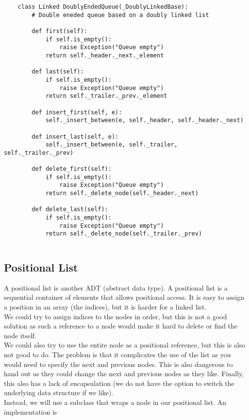 \documentclass[]{article}
\begin{document}
\begin{lstlisting}
	class Linked DoublyEndedQueue(_DoublyLinkedBase):
		# Double eneded queue based on a doubly linked list
		
		def first(self):
			if self.is_empty():
				raise Exception("Queue empty")
			return self._header._next._element
		
		def last(self):
			if self.is_empty():
				raise Exception("Queue empty")
			return self._trailer._prev._element
		
		def insert_first(self, e):
			self._insert_between(e, self._header, self._header._next)
			
		def insert_last(self, e):
			self._insert_between(e, self._trailer, self._trailer._prev)
		
		def delete_first(self):
			if self.is_empty():
				raise Exception("Queue empty")
			return self._delete_node(self._header._next)
			
		def delete_last(self):
			if self.is_empty():
				raise Exception("Queue empty")
			return self._delete_node(self._trailer._prev)
		
\end{lstlisting}\bigbreak

\subsection{Positional List}\bigbreak

A positional list is another ADT (abstract data type). A positional list is a sequential container of elements that allows positional access. It is easy to assign a position in an array (the indices), but it is harder for a linked list. \\

We could try to assign indices to the nodes in order, but this is not a good solution as such a reference to a node would make it hard to delete or find the node itself. \\

We could also try to use the entire node as a positional reference, but this is also not good to do. The problem is that it complicates the use of the list as you would need to specify the next and previous nodes. This is also dangerous to hand out as they could change the next and previous nodes as they like. Finally, this also has a lack of encapsulation (we do not have the option to switch the underlying data structure if we like).\\

Instead, we will use a subclass that wraps a node in our positional list. An implementation is
\end{document}
